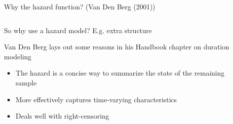 \documentclass[notes,11pt, aspectratio=169]{beamer}
\newenvironment{wideitemize}{\itemize\addtolength{\itemsep}{10pt}}{\enditemize}
\begin{document}
\begin{frame}{Why the hazard function? (Van Den Berg (2001))}
    \begin{columns}[T] %
    \begin{column}{.4\textwidth}
      \begin{wideitemize}
      \item<1-> So why use a hazard model? E.g. extra structure
      \item<1-> Van Den Berg lays out some reasons in his Handbook chapter
        on duration modeling
        \begin{itemize}
        \item<1-> The hazard is a concise way to summarize the state
          of the remaining sample
        \item<2-> More effectively captures time-varying characteristics
        \item<2-> Deals well with right-censoring
        \end{itemize}
        \end{wideitemize}
    \end{column}%
  \hfill%
  \begin{column}{.6\textwidth}
    \begin{center}
    \end{center}
  \end{column}
\end{columns}

\end{frame}
\end{document}
